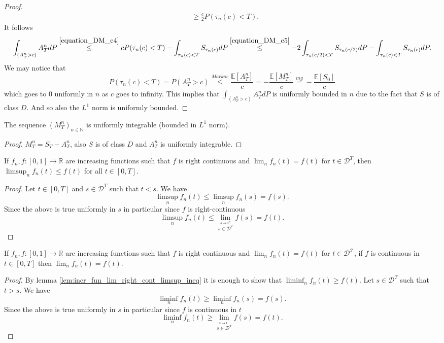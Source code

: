 \begin{proof}
\begin{align}
  &\geq \frac{c}{2}P(\tau_n(c)<T).\label{equation_DM_e5}
  \end{align}
  It follows
  $$
  \int_{(A^n_T>c)}A^n_TdP\stackrel{\eqref{equation_DM_e4}}{\leq}cP(\tau_n(c)<T)-\int_{\tau_n(c)<T}S_{\tau_n(c)}dP\stackrel{\eqref{equation_DM_e5}}{\leq}-2\int_{\tau_n(c/2)<T}S_{\tau_n(c/2)}dP-\int_{\tau_n(c)<T}S_{\tau_n(c)}dP.
  $$
  We may notice that
  $$
  P(\tau_n(c)<T)=P(A^n_T>c)\stackrel{Markov}{\leq}\frac{\mathbb{E}[A^n_T]}{c}=-\frac{\mathbb{E}[M^n_T]}{c}\stackrel{mg}{=}-\frac{\mathbb{E}[S_0]}{c}
  $$
  which goes to $0$ uniformly in $n$ as $c$ goes to infinity.
  This implies that $\int_{(A^n_T>c)}A^n_TdP$ is uniformly bounded in $n$ due to the fact that $S$ is of class $D$. And so also the $L^1$ norm is uniformly bounded.
\end{proof}

\begin{lemma}\label{lem:M_uniform_integrabl}
  The sequence $(M^n_T)_{n\in\mathbb{N}}$ is uniformly integrable (bounded in $L^1$ norm).
\end{lemma}
\begin{proof}
  $M^n_T=S_T-A^n_T$, also $S$ is of class $D$ and $A^n_T$ is uniformly integrable.
\end{proof}

\begin{lemma}\label{lem:incr_fun_lim_right_cont_limsup_ineq}
  If $f_n, f : [0, 1] \rightarrow \mathbb{R}$ are increasing functions such that $f$ is right continuous and
  $\lim_n f_n(t) = f (t)$ for $t \in\mathcal{D}^T$, then  $\limsup_n  f_n(t) \leq f (t)$ for all $t \in [0, T]$.
\end{lemma}
\begin{proof}
  Let $t\in[0,T]$ and $s\in\mathcal{D}^T$ such that $t<s$. We have
  $$
  \limsup_n f_n(t)\leq \limsup_n f_n(s)=f(s).
  $$
  Since the above is true uniformly in $s$ in particular since $f$ is right-continuous
  $$
  \limsup_n f_n(t)\leq\lim_{\stackrel{s\rightarrow t^+}{s\in\mathcal{D}^T}}f(s)=f(t).
  $$
\end{proof}

\begin{lemma}\label{lem:incr_fun_lim_right_cont_lim_eq}
  If $f_n, f : [0, 1] \rightarrow \mathbb{R}$ are increasing functions such that $f$ is right continuous and
  $\lim_n f_n(t) = f (t)$ for $t \in\mathcal{D^T}$, if $f$ is continuous in $t\in[0,T]$ then $\lim_n  f_n(t) = f (t)$.
\end{lemma}
\begin{proof}
  By lemma \ref{lem:incr_fun_lim_right_cont_limsup_ineq} it is enough to show that $\liminf_n f_n(t)\geq f(t)$.
  Let $s\in\mathcal{D}^T$ such that $t>s$. We have
  $$
  \liminf_n f_n(t)\geq \liminf_n f_n(s)=f(s).
  $$
  Since the above is true uniformly in $s$ in particular since $f$ is continuous in $t$
  $$
  \liminf_n f_n(t)\geq\lim_{\stackrel{s\rightarrow t^-}{s\in\mathcal{D}^T}}f(s)=f(t).
$$
\end{proof}

